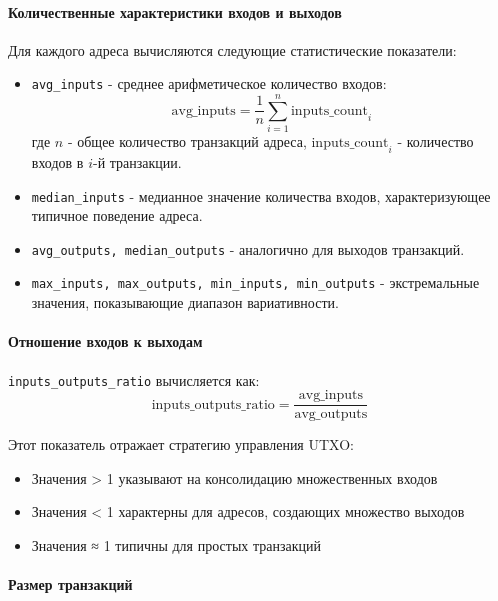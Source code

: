\paragraph{Количественные характеристики входов и выходов}

Для каждого адреса вычисляются следующие статистические показатели:

\begin{itemize}
    \item \texttt{avg\_inputs} - среднее арифметическое количество входов:
    \begin{equation}
        \text{avg\_inputs} = \frac{1}{n} \sum_{i=1}^{n} \text{inputs\_count}_i
    \end{equation}
    где $n$ - общее количество транзакций адреса, $\text{inputs\_count}_i$ - количество входов в $i$-й транзакции.
    
    \item \texttt{median\_inputs} - медианное значение количества входов, характеризующее типичное поведение адреса.
    
    \item \texttt{avg\_outputs, median\_outputs} - аналогично для выходов транзакций.
    
    \item \texttt{max\_inputs, max\_outputs, min\_inputs, min\_outputs} - экстремальные значения, показывающие диапазон вариативности.
\end{itemize}

\paragraph{Отношение входов к выходам}

\texttt{inputs\_outputs\_ratio} вычисляется как:
\begin{equation}
    \text{inputs\_outputs\_ratio} = \frac{\text{avg\_inputs}}{\text{avg\_outputs}}
\end{equation}

Этот показатель отражает стратегию управления UTXO:
\begin{itemize}
    \item Значения > 1 указывают на консолидацию множественных входов
    \item Значения < 1 характерны для адресов, создающих множество выходов
    \item Значения ≈ 1 типичны для простых транзакций
\end{itemize}

\paragraph{Размер транзакций}


